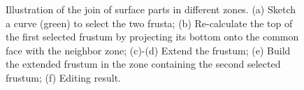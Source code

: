 \begin{figure} [htbp]
  \caption{Illustration of the join of surface parts in different zones.
  (a) Sketch a curve (green) to select the two frusta;
  (b) Re-calculate the top of the first selected frustum by projecting its bottom onto the common face with the neighbor zone;
  (c)-(d) Extend the frustum;
  (e) Build the extended frustum in the zone containing the second selected frustum;
  (f) Editing result.}
  \label{fig:join2zone}
\end{figure}

